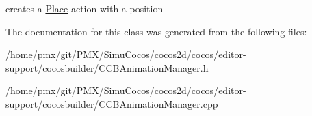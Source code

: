 creates a \hyperlink{classPlace}{Place} action with a position 

The documentation for this class was generated from the following files\+:\begin{DoxyCompactItemize}
\item 
/home/pmx/git/\+P\+M\+X/\+Simu\+Cocos/cocos2d/cocos/editor-\/support/cocosbuilder/C\+C\+B\+Animation\+Manager.\+h\item 
/home/pmx/git/\+P\+M\+X/\+Simu\+Cocos/cocos2d/cocos/editor-\/support/cocosbuilder/C\+C\+B\+Animation\+Manager.\+cpp\end{DoxyCompactItemize}
